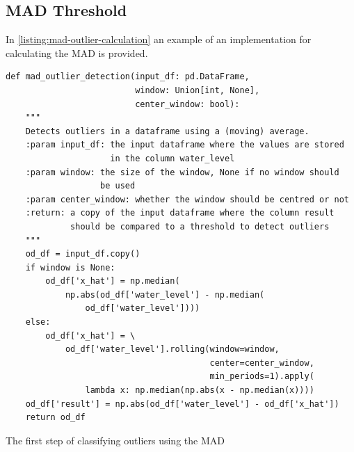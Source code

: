 \subsection{MAD Threshold}
In \autoref{listing:mad-outlier-calculation} an example of an implementation for calculating the \ac{MAD} is provided.
\begin{listing}[htp]
\small
\begin{verbatim}
def mad_outlier_detection(input_df: pd.DataFrame,
                          window: Union[int, None],
                          center_window: bool):
    """
    Detects outliers in a dataframe using a (moving) average.
    :param input_df: the input dataframe where the values are stored
                     in the column water_level
    :param window: the size of the window, None if no window should
                   be used
    :param center_window: whether the window should be centred or not
    :return: a copy of the input dataframe where the column result
             should be compared to a threshold to detect outliers
    """
    od_df = input_df.copy()
    if window is None:
        od_df['x_hat'] = np.median(
            np.abs(od_df['water_level'] - np.median(
                od_df['water_level'])))
    else:
        od_df['x_hat'] = \
            od_df['water_level'].rolling(window=window,
                                         center=center_window,
                                         min_periods=1).apply(
                lambda x: np.median(np.abs(x - np.median(x))))
    od_df['result'] = np.abs(od_df['water_level'] - od_df['x_hat'])
    return od_df
\end{verbatim}
\caption{The first step of classifying outliers using the \ac{MAD}}
\label{listing:mad-outlier-calculation}
\end{listing}
\clearpage
